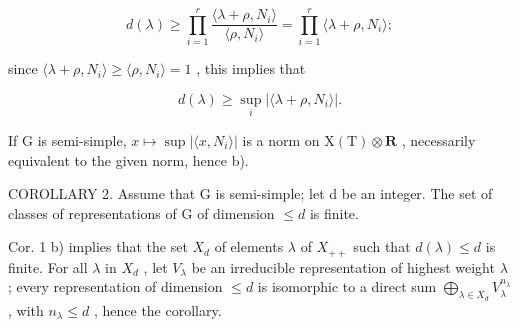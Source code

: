 \[
d (\lambda) \geq \prod_ {i = 1} ^ {r} \frac {\langle \lambda + \rho , N _ {i} \rangle}{\langle \rho , N _ {i} \rangle} = \prod_ {i = 1} ^ {r} \langle \lambda + \rho , N _ {i} \rangle ;
\]

since \(\langle \lambda +\rho ,N_i\rangle \geq \langle \rho ,N_i\rangle = 1\) , this implies that

\[
d (\lambda) \geq \sup _ {i} | \langle \lambda + \rho , N _ {i} \rangle |.
\]

If G is semi-simple, \(x \mapsto \sup |\langle x, N_{i} \rangle|\) is a norm on \(\mathrm{X(T)} \otimes \mathbf{R}\) , necessarily equivalent to the given norm, hence b).

COROLLARY 2. Assume that G is semi-simple; let d be an integer. The set of classes of representations of G of dimension \(\leq d\) is finite.

Cor. 1 b) implies that the set \(X_{d}\) of elements \(\lambda\) of \(X_{++}\) such that \(d(\lambda) \leq d\) is finite. For all \(\lambda\) in \(X_{d}\) , let \(V_{\lambda}\) be an irreducible representation of highest weight \(\lambda\) ; every representation of dimension \(\leq d\) is isomorphic to a direct sum \(\bigoplus_{\lambda \in X_{d}} V_{\lambda}^{n_{\lambda}}\) , with \(n_{\lambda} \leq d\) , hence the corollary.


